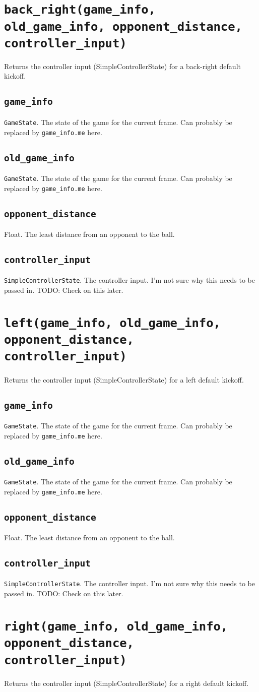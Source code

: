 \documentclass{article}
\newcommand{\function}[1]{\section{\texttt{#1}}}
\newcommand{\argumenta}[1]{\subsection{\texttt{#1}}}
\begin{document}
\begin{flushleft}
\function{back\_right(game\_info, old\_game\_info, opponent\_distance, controller\_input)}
         {
           Returns the controller input (SimpleControllerState) for a back-right default kickoff.

           \argumenta{game\_info}
                     {
                       \texttt{GameState}.  The state of the game for the current frame.  Can probably be replaced by \texttt{game\_info.me} here.
                     }
           \argumenta{old\_game\_info}
                     {
                       \texttt{GameState}.  The state of the game for the current frame.  Can probably be replaced by \texttt{game\_info.me} here.
                     }
           \argumenta{opponent\_distance}
                     {
                       Float.  The least distance from an opponent to the ball.
                     }
           \argumenta{controller\_input}
                     {
                       \texttt{SimpleControllerState}.  The controller input.  I'm not sure why this needs to be passed in.  TODO: Check on this later.
                     }
         }


\function{left(game\_info, old\_game\_info, opponent\_distance, controller\_input)}
         {
           Returns the controller input (SimpleControllerState) for a left default kickoff.

           \argumenta{game\_info}
                     {
                       \texttt{GameState}.  The state of the game for the current frame.  Can probably be replaced by \texttt{game\_info.me} here.
                     }
           \argumenta{old\_game\_info}
                     {
                       \texttt{GameState}.  The state of the game for the current frame.  Can probably be replaced by \texttt{game\_info.me} here.
                     }
           \argumenta{opponent\_distance}
                     {
                       Float.  The least distance from an opponent to the ball.
                     }
           \argumenta{controller\_input}
                     {
                       \texttt{SimpleControllerState}.  The controller input.  I'm not sure why this needs to be passed in.  TODO: Check on this later.
                     }
         }

\function{right(game\_info, old\_game\_info, opponent\_distance, controller\_input)}
         {
           Returns the controller input (SimpleControllerState) for a right default kickoff.

}
\end{flushleft}
\end{document}
